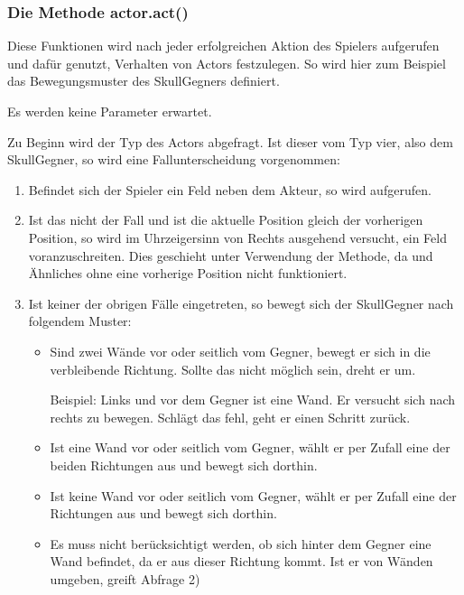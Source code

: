 \documentclass[letterpaper,10pt,ngerman]{sphinxmanual}
\begin{document}
\subsubsection{Die Methode actor.act()}
\label{\detokenize{programming:die-methode-actor-act}}
Diese Funktionen wird nach jeder erfolgreichen Aktion des Spielers aufgerufen
und dafür genutzt, Verhalten von Actors festzulegen. So wird hier zum Beispiel
das Bewegungsmuster des Skull\sphinxhyphen{}Gegners definiert.


Es werden keine Parameter erwartet.


Zu Beginn wird der Typ des Actors abgefragt. Ist dieser vom Typ vier, also dem
Skull\sphinxhyphen{}Gegner, so wird eine Fallunterscheidung vorgenommen:
\begin{enumerate}
%
\item {} 
Befindet sich der Spieler ein Feld neben dem Akteur, so wird
 aufgerufen.

\item {} 
Ist das nicht der Fall und ist die aktuelle Position gleich der vorherigen
Position, so wird im
Uhrzeigersinn von Rechts ausgehend versucht, ein Feld voranzuschreiten.
Dies geschieht unter Verwendung der  Methode, da 
und Ähnliches ohne eine vorherige Position nicht funktioniert.

\item {} 
Ist keiner der obrigen Fälle eingetreten, so bewegt sich der Skull\sphinxhyphen{}Gegner
nach folgendem Muster:
\begin{itemize}
\item {} 
Sind zwei Wände vor oder seitlich vom Gegner, bewegt er sich in die
verbleibende Richtung. Sollte das nicht möglich sein, dreht er um.

Beispiel: Links und vor dem Gegner ist eine Wand. Er versucht sich nach
rechts zu bewegen. Schlägt das fehl, geht er einen Schritt zurück.

\item {} 
Ist eine Wand vor oder seitlich vom Gegner, wählt er per Zufall eine der
beiden Richtungen aus und bewegt sich dorthin.

\item {} 
Ist keine Wand vor oder seitlich vom Gegner, wählt er per Zufall eine der
Richtungen aus und bewegt sich dorthin.

\item {} 
Es muss nicht berücksichtigt werden, ob sich hinter dem Gegner eine Wand
befindet, da er aus dieser Richtung kommt. Ist er von Wänden umgeben,
greift Abfrage 2)

\end{itemize}

\end{enumerate}
\end{document}
